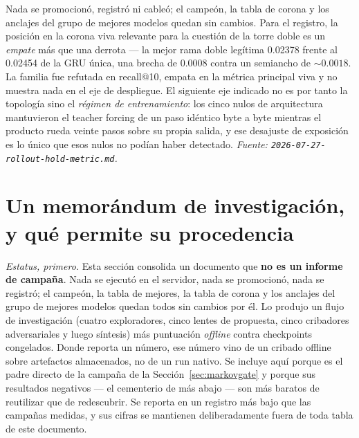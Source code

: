 \documentclass[11pt]{article}
\begin{document}
Nada se promocionó, registró ni cableó; el campeón, la tabla de corona y los
anclajes del grupo de mejores modelos quedan sin cambios. Para el registro, la
posición en la corona viva relevante para la cuestión de la torre doble es un
\emph{empate} más que una derrota --- la mejor rama doble legítima \num{0.02378}
frente al \num{0.02454} de la GRU única, una brecha de \num{0.0008} contra un
semiancho de ${\sim}\num{0.0018}$. La familia fue refutada en recall@10, empata en
la métrica principal viva y no muestra nada en el eje de despliegue. El siguiente
eje indicado no es por tanto la topología sino el \emph{régimen de entrenamiento}:
los cinco nulos de arquitectura mantuvieron el teacher forcing de un paso idéntico
byte a byte mientras el producto rueda veinte pasos sobre su propia salida, y ese
desajuste de exposición es lo único que esos nulos no podían haber detectado.
\emph{Fuente: \texttt{2026-07-27-rollout-hold-metric.md}.}

\section{Un memorándum de investigación, y qué permite su procedencia}
\label{sec:memo}
\emph{Estatus, primero.} Esta sección consolida un documento que \textbf{no es un
informe de campaña}. Nada se ejecutó en el servidor, nada se promocionó, nada se
registró; el campeón, la tabla de mejores, la tabla de corona y los anclajes del
grupo de mejores modelos quedan todos sin cambios por él. Lo produjo un flujo de
investigación (cuatro exploradores, cinco lentes de propuesta, cinco cribadores
adversariales y luego síntesis) más puntuación \emph{offline} contra checkpoints
congelados. Donde reporta un número, ese número vino de un cribado offline sobre
artefactos almacenados, no de un run nativo. Se incluye aquí porque es el padre
directo de la campaña de la Sección~\ref{sec:markovgate} y porque sus resultados
negativos --- el cementerio de más abajo --- son más baratos de reutilizar que de
redescubrir. Se reporta en un registro más bajo que las campañas medidas, y sus
cifras se mantienen deliberadamente fuera de toda tabla de este documento.
\end{document}
